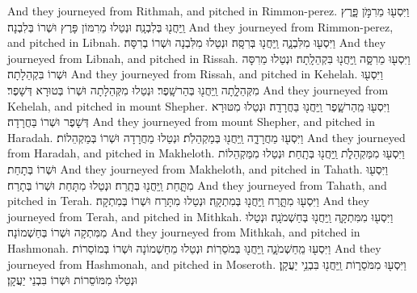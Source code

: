 {And they journeyed from Rithmah, and pitched in Rimmon-perez.}{}
{וַיִּסְע֖וּ מֵרִמֹּ֣ן פָּ֑רֶץ וַֽיַּחֲנ֖וּ בְּלִבְנָֽה׃}
{וּנְטַלוּ מֵרִמּוֹן פָּרֶץ וּשְׁרוֹ בְּלִבְנָה׃}
{And they journeyed from Rimmon-perez, and pitched in Libnah.}{}
{וַיִּסְע֖וּ מִלִּבְנָ֑ה וַֽיַּחֲנ֖וּ בְּרִסָּֽה׃}
{וּנְטַלוּ מִלִּבְנָה וּשְׁרוֹ בְרִסָּה׃}
{And they journeyed from Libnah, and pitched in Rissah.}{}
{וַיִּסְע֖וּ מֵרִסָּ֑ה וַֽיַּחֲנ֖וּ בִּקְהֵלָֽתָה׃}
{וּנְטַלוּ מֵרִסָּה וּשְׁרוֹ בִּקְהֵלָתָה׃}
{And they journeyed from Rissah, and pitched in Kehelah.}{}
{וַיִּסְע֖וּ מִקְּהֵלָ֑תָה וַֽיַּחֲנ֖וּ בְּהַר\maqqaf שָֽׁפֶר׃}
{וּנְטַלוּ מִקְּהֵלָתָה וּשְׁרוֹ בְּטוּרָא דְּשָׁפֶר׃}
{And they journeyed from Kehelah, and pitched in mount Shepher.}{}
{וַיִּסְע֖וּ מֵֽהַר\maqqaf שָׁ֑פֶר וַֽיַּחֲנ֖וּ בַּחֲרָדָֽה׃}
{וּנְטַלוּ מִטּוּרָא דְּשָׁפֶר וּשְׁרוֹ בַּחֲרָדָה׃}
{And they journeyed from mount Shepher, and pitched in Haradah.}{}
{וַיִּסְע֖וּ מֵחֲרָדָ֑ה וַֽיַּחֲנ֖וּ בְּמַקְהֵלֹֽת׃}
{וּנְטַלוּ מֵחֲרָדָה וּשְׁרוֹ בְּמַקְהֵלוֹת׃}
{And they journeyed from Haradah, and pitched in Makheloth.}{}
{וַיִּסְע֖וּ מִמַּקְהֵלֹ֑ת וַֽיַּחֲנ֖וּ בְּתָֽחַת׃}
{וּנְטַלוּ מִמַּקְהֵלוֹת וּשְׁרוֹ בְּתָחַת׃}
{And they journeyed from Makheloth, and pitched in Tahath.}{}
{וַיִּסְע֖וּ מִתָּ֑חַת וַֽיַּחֲנ֖וּ בְּתָֽרַח׃}
{וּנְטַלוּ מִתָּחַת וּשְׁרוֹ בְּתָרַח׃}
{And they journeyed from Tahath, and pitched in Terah.}{}
{וַיִּסְע֖וּ מִתָּ֑רַח וַֽיַּחֲנ֖וּ בְּמִתְקָֽה׃}
{וּנְטַלוּ מִתָּרַח וּשְׁרוֹ בְּמִתְקָה׃}
{And they journeyed from Terah, and pitched in Mithkah.}{}
{וַיִּסְע֖וּ מִמִּתְקָ֑ה וַֽיַּחֲנ֖וּ בְּחַשְׁמֹנָֽה׃}
{וּנְטַלוּ מִמִּתְקָה וּשְׁרוֹ בְּחַשְׁמוֹנָה׃}
{And they journeyed from Mithkah, and pitched in Hashmonah.}{}
{וַיִּסְע֖וּ מֵֽחַשְׁמֹנָ֑ה וַֽיַּחֲנ֖וּ בְּמֹסֵרֽוֹת׃}
{וּנְטַלוּ מֵחַשְׁמוֹנָה וּשְׁרוֹ בְּמוֹסֵרוֹת׃}
{And they journeyed from Hashmonah, and pitched in Moseroth.}{}
{וַיִּסְע֖וּ מִמֹּסֵר֑וֹת וַֽיַּחֲנ֖וּ בִּבְנֵ֥י יַעֲקָֽן׃}
{וּנְטַלוּ מִמּוֹסֵרוֹת וּשְׁרוֹ בִּבְנֵי יַעֲקָן׃}
